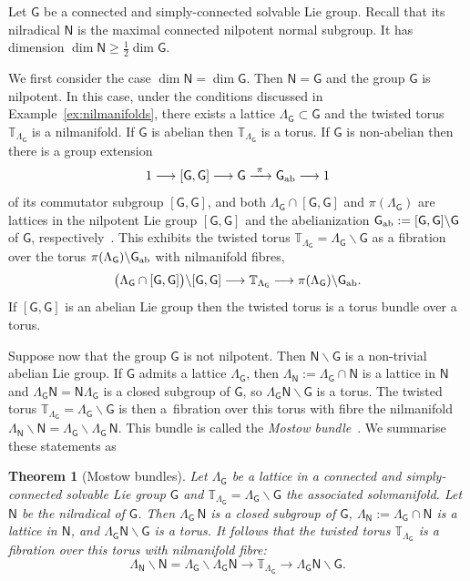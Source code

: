 \documentclass[pdftex]{sigma}
\numberwithin{equation}{section}
\newcommand{\sfG}{\mathsf{G}}
\newcommand{\sfN}{\mathsf{N}}
\newcommand{\torus}{{\mathbb T}} %
\newtheorem{Theorem}{Theorem}[section]
\begin{document}
Let $\sfG$ be
a connected and simply-connected solvable Lie group. Recall that its
nilradical $\sfN$ is the maximal connected nilpotent normal subgroup. It
has dimension $\dim\sfN\geq\frac12\dim\sfG$.

We first consider the case $\dim\sfN=\dim\sfG$. Then
$\sfN=\sfG$ and the group $\sfG$ is nilpotent. In this case, under the
conditions discussed in
Example~\ref{ex:nilmanifolds}, there exists a lattice
$\Lambda_\sfG\subset\sfG$ and the twisted torus $\torus_{\Lambda_\sfG}$ is a
nilmanifold. If $\sfG$ is abelian then $\torus_{\Lambda_\sfG}$ is a
torus. If $\sfG$ is non-abelian then there is a group extension
\[
1\longrightarrow [\sfG,\sfG]\longrightarrow\sfG\xrightarrow{ \ \pi \
}\sfG_{\rm ab}\longrightarrow 1
\]
of its commutator subgroup $[\sfG,\sfG]$,
and both $\Lambda_\sfG\cap[\sfG,\sfG]$ and $\pi(\Lambda_\sfG)$ are
lattices in the nilpotent Lie group $[\sfG,\sfG]$ and the
abelianization $\sfG_{\rm ab}:=[\sfG,\sfG]\backslash\sfG$ of $\sfG$, respectively~\cite{Corwin1990}. This exhibits
the twisted torus $\torus_{\Lambda_\sfG}=\Lambda_\sfG\backslash \sfG $ as a fibration over the torus
$\pi(\Lambda_\sfG)\backslash\sfG_{\rm ab}$ with
nilmanifold fibres,{\samepage
\[
\big(\Lambda_\sfG\cap[\sfG,\sfG]\big)\backslash[\sfG,\sfG] \longrightarrow \torus_{\Lambda_\sfG} \longrightarrow
\pi(\Lambda_\sfG)\backslash \sfG_{\rm ab} .
\]
If $[\sfG,\sfG]$ is an abelian Lie group then the twisted
torus is a torus bundle over a torus.}

Suppose now that the group $\sfG$ is not nilpotent. Then $\sfN\backslash\sfG$
is a non-trivial abelian Lie group. If $\sfG$ admits a lattice $\Lambda_\sfG$, then
$\Lambda_{\sfN}:=\Lambda_\sfG\cap\sfN$ is a lattice in $\sfN$ and
$\Lambda_\sfG \sfN=\sfN \Lambda_\sfG$ is a closed subgroup of $\sfG$, so
$\Lambda_\sfG \sfN\backslash\sfG$ is a torus. The twisted torus
$\torus_{\Lambda_\sfG}=\Lambda_\sfG\backslash\sfG$ is then a~fibration over this torus with fibre
the nilmanifold $\Lambda_{\sfN}\backslash\sfN=\Lambda_\sfG\backslash \Lambda_\sfG\,\sfN$. This
bundle is called the \emph{Mostow bundle}~\cite{Mostow1954}. We summarise these statements as
\begin{Theorem}[Mostow bundles]
\label{thm:Mostowbundle}
Let ${\Lambda_\sfG}$ be a lattice in a connected and simply-connected
solvable Lie group $\sfG$ and $\torus_{\Lambda_\sfG} =
\Lambda_\sfG\backslash\sfG$ the associated solvmanifold. Let $\sfN$ be the nilradical
 of $\sfG$.
Then $\Lambda_\sfG\,\sfN$ is a closed subgroup of $\sfG$,
$\Lambda_{\sfN}:=\Lambda_\sfG\cap\sfN$ is a lattice in
$\sfN$, and $\Lambda_\sfG \sfN\backslash\sfG$ is a torus.
It follows that the twisted torus
$\torus_{\Lambda_\sfG}$ is a fibration over this torus with
nilmanifold fibre:
\[
\Lambda_{\sfN}\backslash\sfN=\Lambda_\sfG\backslash\Lambda_\sfG \sfN
\longrightarrow
\torus_{\Lambda_\sfG}\longrightarrow \Lambda_\sfG \sfN\backslash\sfG .
\]
\end{Theorem}
\end{document}
